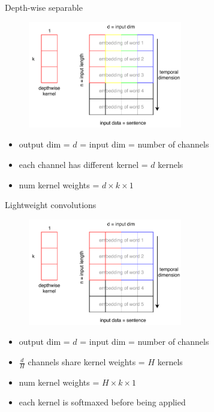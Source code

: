 \documentclass{beamer}
\begin{document}
\begin{frame}{Depth-wise separable}

\begin{figure}[h]
\includegraphics[width=0.6\textwidth]{img/depthwise_conv_nlp}
\end{figure}

\begin{itemize}
\item output dim = $d$ = input dim = number of channels
\item each channel has different kernel = $d$ kernels
\item num kernel weights = $d \times k \times 1$
\end{itemize}

\end{frame}
\begin{frame}{Lightweight convolutions}

\begin{figure}[h]
\includegraphics[width=0.6\textwidth]{img/lightweight_conv}
\end{figure}

\begin{itemize}
\item output dim = $d$ = input dim = number of channels
\item $\frac{d}{H}$ channels share kernel weights = $H$ kernels
\item num kernel weights = $H \times k \times 1$
\item each kernel is softmaxed before being applied
\end{itemize}

\end{frame}
\end{document}
